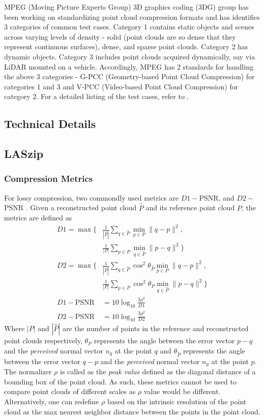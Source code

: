 MPEG (Moving Picture Experts Group) 3D graphics coding (3DG) group has been working on standardizing point cloud compression formats and has identifies 3 categories of common test cases. Category 1 contains static objects and scenes across varying levels of density - solid (point clouds are so dense that they represent continuous surfaces), dense, and sparse point clouds. Category 2 has dynamic objects. Category 3 includes point clouds acquired dynamically, say via LiDAR mounted on a vehicle. Accordingly, MPEG has 2 standards for handling the above 3 categories - G-PCC (Geometry-based Point Cloud Compression) for categories 1 and 3 and V-PCC (Video-based Point Cloud Compression) for category 2. For a detailed listing of the test cases, refer to \cite{mpegx2013MPEG}.

\subsection{Technical Details}

\subsection{LASzip}

\subsubsection{Compression Metrics}

For lossy compression, two commondly used metrics are $D1-$PSNR, and $D2-$PSNR \cite{tian2017geometric}. Given a reconstructed point cloud $\hat{P}$ and its reference point cloud $P$, the metrics are defined as
$$
\begin{aligned}
    D1 = \max \Bigg \{ & \frac{1}{|\hat{P}|} \sum_{q \in \hat{P}} \min_{p \in P} \|q -p\|^2, \\
    & \frac{1}{|P|} \sum_{p \in P} \min_{q \in \hat{P}} \|p -q\|^2 \Bigg \} \\
    D2 = \max \Bigg \{ &\frac{1}{|\hat{P}|} \sum_{q \in \hat{P}} \cos^2 \theta_{\hat{P}}\min_{p \in P} \|q -p\|^2, \\
    & \frac{1}{|P|} \sum_{p \in P} \cos^2 \theta_{P}\min_{q \in \hat{P}} \|p -q\|^2 \Bigg  \} \\
    D1-\text{PSNR} &= 10 \log_{10} \frac{3\rho^2}{D1}  \\
    D2-\text{PSNR} &= 10 \log_{10} \frac{3\rho^2}{D2}
\end{aligned}
$$
Where $|P|$ and $|\hat{P}|$ are the number of points in the reference and reconstructed point clouds respectively, $\theta_P$ represents the angle between the error vector $p - q$ and the \textit{perceived} normal vector $n_q$ at the point $q$ and $\theta_{\hat{P}}$ represents the angle between the error vector $q - p$ and the \textit{perceived} normal vector $n_p$ at the point $p$. The normalizer $\rho$ is called as the \textit{peak value} defined as the diagonal distance of a bounding box of the point cloud. As such, these metrics cannot be used to compare point clouds of different scales as $\rho$ value would be different. Alternatively, one can redefine $\rho$ based on the intrinsic resolution of the point cloud as the max nearest neighbor distance between the points in the point cloud.

